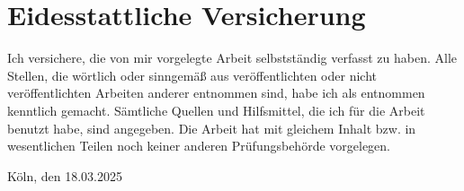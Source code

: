 \clearpage
\thispagestyle{empty}
\section*{Eidesstattliche Versicherung}
\label{sec:SOOA}

\vspace{2.5cm}

Ich versichere, die von mir vorgelegte Arbeit selbstständig verfasst zu haben. Alle Stellen, die wörtlich oder sinngemäß aus veröffentlichten oder nicht veröffentlichten Arbeiten anderer entnommen sind, habe ich als entnommen kenntlich gemacht. Sämtliche Quellen und Hilfsmittel, die ich für die Arbeit benutzt habe, sind angegeben. Die Arbeit hat mit gleichem Inhalt bzw. in wesentlichen Teilen noch keiner anderen Prüfungsbehörde vorgelegen.

\vspace{1cm}
\noindent
\textbf{\thesisauthor{}}

\vspace{0.5cm}
\noindent
Köln, den 18.03.2025
